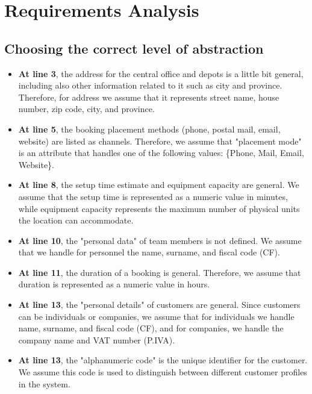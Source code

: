 \documentclass[12pt,a4paper]{article}
\begin{document}
\section{Requirements Analysis}

\subsection{Choosing the correct level of abstraction}

\begin{itemize}
    \item \textbf{At line 3}, the address for the central office and depots is a little bit general, including also other information related to it such as city and province. Therefore, for address we assume that it represents street name, house number, zip code, city, and province.
    
    \item \textbf{At line 5}, the booking placement methods (phone, postal mail, email, website) are listed as channels. Therefore, we assume that "placement mode" is an attribute that handles one of the following values: \{Phone, Mail, Email, Website\}.
    
    \item \textbf{At line 8}, the setup time estimate and equipment capacity are general. We assume that the setup time is represented as a numeric value in minutes, while equipment capacity represents the maximum number of physical units the location can accommodate.
    
    \item \textbf{At line 10}, the "personal data" of team members is not defined. We assume that we handle for personnel the name, surname, and fiscal code (CF). 
    
    \item \textbf{At line 11}, the duration of a booking is general. Therefore, we assume that duration is represented as a numeric value in hours.
    
    \item \textbf{At line 13}, the "personal details" of customers are general. Since customers can be individuals or companies, we assume that for individuals we handle name, surname, and fiscal code (CF), and for companies, we handle the company name and VAT number (P.IVA).
    
    \item \textbf{At line 13}, the "alphanumeric code" is the unique identifier for the customer. We assume this code is used to distinguish between different customer profiles in the system.
\end{itemize}
\end{document}
